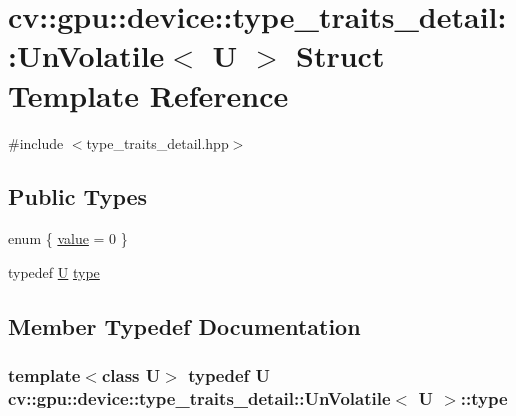 \hypertarget{structcv_1_1gpu_1_1device_1_1type__traits__detail_1_1UnVolatile}{\section{cv\-:\-:gpu\-:\-:device\-:\-:type\-\_\-traits\-\_\-detail\-:\-:Un\-Volatile$<$ U $>$ Struct Template Reference}
\label{structcv_1_1gpu_1_1device_1_1type__traits__detail_1_1UnVolatile}
}


{\ttfamily \#include $<$type\-\_\-traits\-\_\-detail.\-hpp$>$}

\subsection*{Public Types}
\begin{DoxyCompactItemize}
\item 
enum \{ \hyperlink{structcv_1_1gpu_1_1device_1_1type__traits__detail_1_1UnVolatile_abbe4745c3d447aceda59110383df2312ad259b4dc86dc1dedf87fbf596fcb47bc}{value} = 0
 \}
\item 
typedef \hyperlink{core__c_8h_aa9c521f41af9a5191e5e4b6ffbae211a}{U} \hyperlink{structcv_1_1gpu_1_1device_1_1type__traits__detail_1_1UnVolatile_adad51d1af5ac119c628bc6bd6e2fb0ab}{type}
\end{DoxyCompactItemize}


\subsection{Member Typedef Documentation}
\hypertarget{structcv_1_1gpu_1_1device_1_1type__traits__detail_1_1UnVolatile_adad51d1af5ac119c628bc6bd6e2fb0ab}{
\subsubsection[{type}]{\setlength{\rightskip}{0pt plus 5cm}template$<$class U$>$ typedef {\bf U} {\bf cv\-::gpu\-::device\-::type\-\_\-traits\-\_\-detail\-::\-Un\-Volatile}$<$ {\bf U} $>$\-::{\bf type}}}\label{structcv_1_1gpu_1_1device_1_1type__traits__detail_1_1UnVolatile_adad51d1af5ac119c628bc6bd6e2fb0ab}


